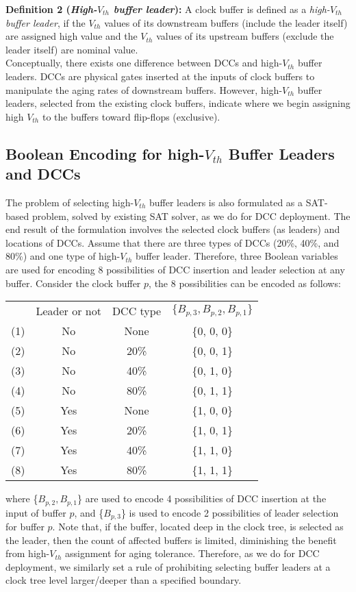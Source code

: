 \noindent \textbf{Definition 2 (\textit{High-$V_{th}$ buffer leader}):} A clock buffer is defined as a \textit{high-$V_{th}$ buffer leader}, if the $V_{th}$ values of its downstream buffers (include the leader itself) are assigned high value and the $V_{th}$ values of its upstream buffers (exclude the leader itself) are nominal value.\\

Conceptually, there exists one difference between DCCs and high-$V_{th}$ buffer leaders. DCCs are physical gates inserted at the inputs of clock buffers to manipulate the aging rates of downstream buffers. However, high-$V_{th}$ buffer leaders, selected from the existing clock buffers, indicate where we begin assigning high $V_{th}$ to the buffers toward flip-flops (exclusive).

\subsection{Boolean Encoding for high-$V_{th}$ Buffer Leaders and DCCs}
The problem of selecting high-$V_{th}$ buffer leaders is also formulated as a SAT-based problem, solved by existing SAT solver, as we do for DCC deployment. The end result of the formulation involves the selected clock buffers (as leaders) and locations of DCCs. Assume that there are three types of DCCs (20\%, 40\%, and 80\%) and one type of high-$V_{th}$ buffer leader. Therefore, three Boolean variables are used for encoding 8 possibilities of DCC insertion and leader selection at any buffer. Consider the clock buffer $p$, the 8 possibilities can be encoded as follows:
{\small
\begin{tabular}{  c  c  c  c  }
  	 & Leader or not & DCC type & $\{B_{p,3}, B_{p,2}, B_{p,1}\}$ \\ 
  	(1)\quad & No & None & \{0, 0, 0\} \\ 
  	(2)\quad & No &20\% &  \{0, 0, 1\} \\ 
  	(3)\quad & No &40\% &  \{0, 1, 0\} \\ 
  	(4)\quad & No &80\% &  \{0, 1, 1\} \\ 
	(5)\quad & Yes & None & \{1, 0, 0\} \\ 
  	(6)\quad & Yes & 20\% &  \{1, 0, 1\} \\ 
  	(7)\quad & Yes & 40\% &  \{1, 1, 0\} \\ 
  	(8)\quad & Yes & 80\% &  \{1, 1, 1\} \\ 
\end{tabular}}

\noindent where \{$B_{p,2}, B_{p,1}$\} are used to encode 4 possibilities of DCC insertion at the input of buffer $p$, and \{$B_{p,3}$\} is used to encode 2 possibilities of leader selection for buffer $p$.
Note that, if the buffer, located deep in the clock tree, is selected as the leader, then the count of affected buffers is limited, diminishing the benefit from high-$V_{th}$ assignment for aging tolerance. Therefore, as we do for DCC deployment, we similarly set a rule of prohibiting selecting buffer leaders at a clock tree level larger/deeper than a specified boundary.
